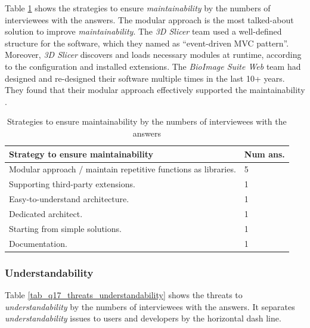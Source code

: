 \documentclass[final, 3p, times, authoryear]{elsarticle}
\begin{document}
Table \ref{tab_q16_strategies_maintainability} shows the strategies to ensure
\textit{maintainability} by the numbers of interviewees with the answers. The
modular approach is the most talked-about solution to improve
\textit{maintainability}. The \textit{3D Slicer} team used a well-defined
structure for the software, which they named as ``event-driven MVC pattern''.
Moreover, \textit{3D Slicer} discovers and loads necessary modules at runtime,
according to the configuration and installed extensions. The \textit{BioImage
Suite Web} team had designed and re-designed their software multiple times in
the last 10+ years. They found that their modular approach effectively supported
the maintainability \citep{Joshi2011}. 

\begin{table}[ht]
\centering
\begin{tabular}{ll}
\hline
Strategy to ensure maintainability & Num ans. \\ \hline
Modular approach / maintain repetitive functions as libraries. & 5 \\
Supporting third-party extensions. & 1 \\
Easy-to-understand architecture. & 1 \\
Dedicated architect. & 1 \\
Starting from simple solutions. & 1 \\
Documentation. & 1 \\ \hline
\end{tabular}
\caption{\label{tab_q16_strategies_maintainability}Strategies to ensure
maintainability by the numbers of interviewees with the answers}
\end{table}

\subsubsection{Understandability} \label{sec_interview_understandability}


Table \ref{tab_q17_threats_understandability} shows the threats to
\textit{understandability} by the numbers of interviewees with the answers. It
separates \textit{understandability} issues to users and developers by the
horizontal dash line.
\end{document}
